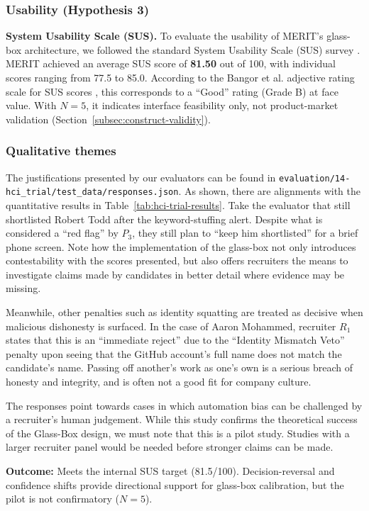 \subsubsection{Usability (Hypothesis 3)}
\textbf{System Usability Scale (SUS).} To evaluate the usability of MERIT's glass-box architecture, we followed the standard System Usability Scale (SUS) survey \cite{brooke1996sus}.
MERIT achieved an average SUS score of \textbf{81.50} out of 100, with individual scores ranging from 77.5 to 85.0.
According to the Bangor et al. adjective rating scale for SUS scores \cite{bangor2009_sus}, this corresponds to a ``Good'' rating (Grade B) at face value.
With $N=5$, it indicates interface feasibility only, not product-market validation (Section~\ref{subsec:construct-validity}).

\subsubsection{Qualitative themes}

The justifications presented by our evaluators can be found in \texttt{evaluation/14-hci\_trial/test\_data/responses.json}. As shown, there are
alignments with the quantitative results in Table~\ref{tab:hci-trial-results}. Take the evaluator
that still shortlisted Robert Todd after the keyword-stuffing alert. Despite what is considered a ``red flag'' by $P_3$, they still plan to 
``keep him shortlisted'' for a brief phone screen. Note how the implementation of the glass-box not only introduces contestability with the 
scores presented, but also offers recruiters the means to investigate claims made by candidates in better detail where evidence may be missing.

Meanwhile, other penalties such as identity squatting are treated as decisive when malicious dishonesty is surfaced. In the case of Aaron Mohammed,
recruiter $R_1$ states that this is an ``immediate reject'' due to the ``Identity Mismatch Veto'' penalty upon seeing that the GitHub account's
full name does not match the candidate's name. Passing off another's work as one's own is a serious breach of honesty and integrity, and is often 
not a good fit for company culture. 

The responses point towards cases in which automation bias can be challenged by a recruiter's human judgement. While this study confirms the 
theoretical success of the Glass-Box design, we must note that this is a pilot study. Studies with a larger recruiter panel would be needed
before stronger claims can be made.

\textbf{Outcome:} Meets the internal SUS target (81.5/100).
Decision-reversal and confidence shifts provide directional support for glass-box calibration, but the pilot is not confirmatory ($N=5$).